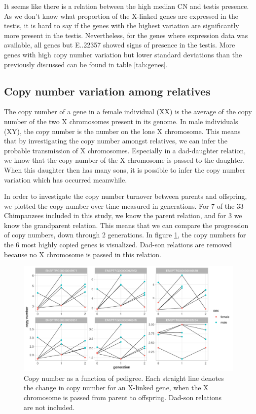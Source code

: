 \noindent It seems like there is a relation between the high median CN and testis presence. As we don't know what proportion of the X-linked genes are expressed in the testis, it is hard to say if the genes with the highest variation are significantly more present in the testis. Nevertheless, for the genes where expression data was available, all genes but E..22357 showed signs of presence in the testis. More genes with high copy number variation but lower standard deviations than the previously discussed can be found in table \ref{tab:genes}.


\subsection*{Copy number variation among relatives}
The copy number of a gene in a female individual (XX) is the average of the copy number of the two X chromosomes present in its genome. In male individuals (XY), the copy number is the number on the lone X chromosome. This means that by investigating the copy number amongst relatives, we can infer the probable transmission of X chromosomes. Especially in a dad-daughter relation, we know that the copy number of the X chromosome is passed to the daughter. When this daughter then has many sons, it is possible to infer the copy number variation which has occurred meanwhile.

In order to investigate the copy number turnover between parents and offspring, we plotted the copy number over time measured in generations. For 7 of the 33 Chimpanzees included in this study, we know the parent relation, and for 3 we know the grandparent relation. This means that we can compare the progression of copy numbers, down through 2 generations. In figure \ref{fig:pedigree_CN}, the copy numbers for the 6 most highly copied genes is visualized. Dad-son relations are removed because no X chromosome is passed in this relation.

\begin{figure}[h] 
  \centering
  \includegraphics[scale=0.78]{figures/fig_pedigree_CN_3.pdf}
  \caption{Copy number as a function of pedigree. Each straight line denotes the change in copy number for an X-linked gene, when the X chromosome is passed from parent to offspring. Dad-son relations are not included.}
  \label{fig:pedigree_CN}
\end{figure}

